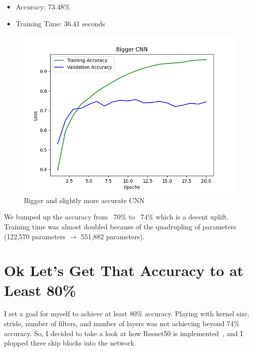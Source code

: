 \documentclass{article}
\begin{document}
    \begin{itemize}
        \item Accuracy: 73.48\%
        \item Training Time: 36.41 seconds
    \end{itemize}

    \begin{figure}[!htbp]
        \centerline{\includegraphics[width=0.55\columnwidth]{Bigger CNN}}
        \caption{Bigger and slightly more accurate CNN}
        \label{fig:bigger}
    \end{figure}

    We bumped up the accuracy from ~70\% to ~74\% which is a decent uplift.
    Training time was almost doubled because of the quadrupling of parameters (122,570 parameters $\rightarrow$ 551,882 parameters).
%
    \section{Ok Let's Get That Accuracy to at Least 80\%}\label{skip-connections}

    I set a goal for myself to achieve at least 80\% accuracy.
    Playing with kernel size, stride, number of filters, and number of layers was not achieving beyond 74\% accuracy.
    So, I decided to take a look at how Resnet50 is implemented~\cite{mukherjee2022annotated}, and I plopped three skip blocks into the network.
\end{document}
